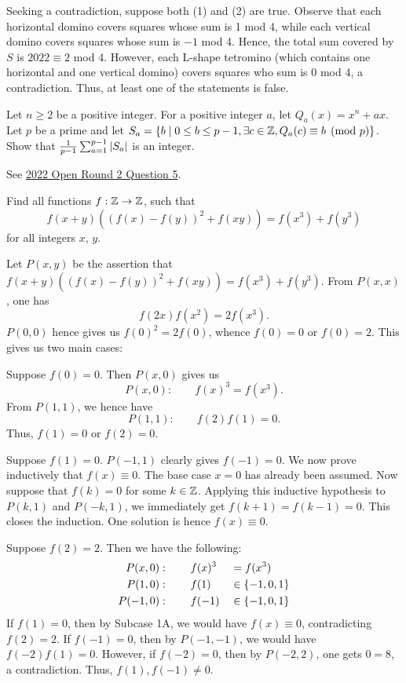 Seeking a contradiction, suppose both (1) and (2) are true. Observe that each horizontal domino covers squares whose sum is 1 mod 4, while each vertical domino covers squares whose sum is $-1$ mod 4. Hence, the total sum covered by $S$ is $2022 \equiv 2$ mod 4. However, each L-shape tetromino (which contains one horizontal and one vertical domino) covers squares who sum is 0 mod 4, a contradiction. Thus, at least one of the statements is false.

\begin{question}\label{A::2023-O-2-3}
    Let $n \geq 2$ be a positive integer. For a positive integer $a$, let $Q_a(x) = x^n + ax$. Let $p$ be a prime and let $S_a = \left\lbrace b \mid 0 \leq b \leq p - 1, \exists c \in \mathbb{Z}, Q_a(c) \equiv b \pmod{p} \right\rbrace$. Show that $\frac{1}{p-1} \sum_{a=1}^{p-1} \left\lvert S_a \right\rvert$ is an integer.
\end{question}

See \hyperref[A::2022-O-2-5]{2022 Open Round 2 Question 5}.

\begin{question}\label{A::2023-O-2-4}
    Find all functions $f : \mathbb{Z} \to \mathbb{Z}$, such that \[f(x+y)((f(x) - f(y))^2 + f(xy)) = f(x^3) + f(y^3)\] for all integers $x$, $y$.
\end{question}


 Let $P(x, y)$ be the assertion that $f(x+y)((f(x) - f(y))^2 + f(xy)) = f(x^3) + f(y^3)$. From $P(x, x)$, one has \[f(2x)f(x^2) = 2f(x^3).\] $P(0, 0)$ hence gives us $f(0)^2 = 2f(0)$, whence $f(0) = 0$ or $f(0) = 2$. This gives us two main cases:

 Suppose $f(0) = 0$. Then $P(x, 0)$ gives us \[P(x, 0) : \qquad f(x)^3 = f(x^3).\] From $P(1, 1)$, we hence have \[P(1, 1) : \qquad f(2)f(1) = 0.\] Thus, $f(1) = 0$ or $f(2) = 0$.

 Suppose $f(1) = 0$. $P(-1, 1)$ clearly gives $f(-1) = 0$. We now prove inductively that $f(x) \equiv 0$. The base case $x = 0$ has already been assumed. Now suppose that $f(k) = 0$ for some $k \in \mathbb{Z}$. Applying this inductive hypothesis to $P(k, 1)$ and $P(-k, 1)$, we immediately get $f(k + 1) = f(k - 1) = 0$. This closes the induction. One solution is hence $f(x) \equiv 0$.

 Suppose $f(2) = 2$. Then we have the following:
\begin{alignat*}{2}
    P(x, 0) &: \qquad f(x)^3 &&= f(x^3)\\
    P(1, 0) &: \qquad f(1) &&\in \left\lbrace -1, 0, 1 \right\rbrace\\
    P(-1, 0) &: \qquad f(-1) &&\in \left\lbrace -1, 0, 1 \right\rbrace
\end{alignat*} 
If $f(1) = 0$, then by Subcase 1A, we would have $f(x) \equiv 0$, contradicting $f(2) = 2$. If $f(-1) = 0$, then by $P(-1, -1)$, we would have $f(-2)f(1) = 0$. However, if $f(-2) = 0$, then by $P(-2, 2)$, one gets $0 = 8$, a contradiction. Thus, $f(1), f(-1) \neq 0$.

